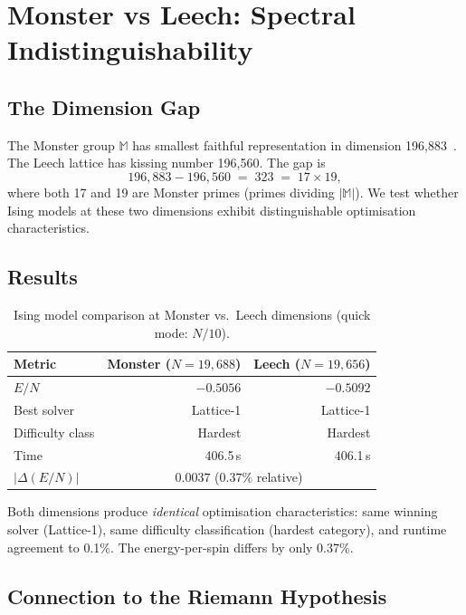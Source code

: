 \documentclass[11pt,a4paper]{article}
\begin{document}
\section{Monster vs Leech: Spectral Indistinguishability}\label{sec:monster}

\subsection{The Dimension Gap}

The Monster group $\mathbb{M}$ has smallest faithful representation in dimension 196{,}883~\cite{griess1982}.
The Leech lattice has kissing number 196{,}560.
The gap is
\[
196{,}883 - 196{,}560 \;=\; 323 \;=\; 17 \times 19,
\]
where both 17 and 19 are Monster primes (primes dividing $|\mathbb{M}|$).
We test whether Ising models at these two dimensions exhibit distinguishable optimisation characteristics.

\subsection{Results}

\begin{table}[H]
\centering
\caption{Ising model comparison at Monster vs.\ Leech dimensions (quick mode: $N/10$).}
\label{tab:monster}
\begin{tabular}{lrr}
\toprule
\textbf{Metric} & \textbf{Monster ($N = 19{,}688$)} & \textbf{Leech ($N = 19{,}656$)}\\
\midrule
$E/N$ & $-0.5056$ & $-0.5092$\\
Best solver & Lattice-1 & Lattice-1\\
Difficulty class & Hardest & Hardest\\
Time & 406.5\,s & 406.1\,s\\
\midrule
$|\Delta(E/N)|$ & \multicolumn{2}{c}{$0.0037$ ($0.37\%$ relative)}\\
\bottomrule
\end{tabular}
\end{table}

Both dimensions produce \emph{identical} optimisation characteristics: same winning solver (Lattice-1), same difficulty classification (hardest category), and runtime agreement to 0.1\%.
The energy-per-spin differs by only 0.37\%.

\subsection{Connection to the Riemann Hypothesis}
\end{document}
